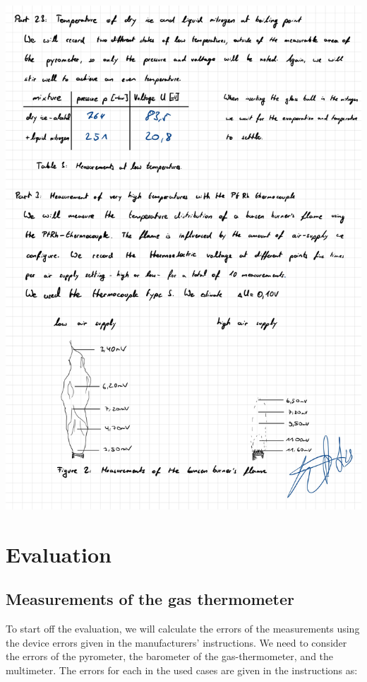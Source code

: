 \documentclass{article}
\begin{document}
\includegraphics[width=\textwidth]{graphics/mess3.jpg}
\newpage

\addtocounter{table}{3}
\addtocounter{figure}{2}

\section{Evaluation}

\subsection{Measurements of the gas thermometer}

To start off the evaluation, we will calculate the errors of the measurements using the device errors given in the manufacturers' instructions. We need to consider the errors of the pyrometer, the barometer of the gas-thermometer, and the multimeter. The errors for each in the used cases are given in the instructions as:
\end{document}
